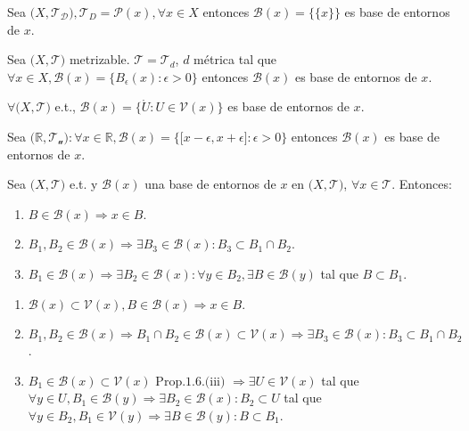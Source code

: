 \begin{ejm}
  Sea $\big( X, \mathcal{T_{D}} \big), \mathcal{T}_{D} = \mathcal{P}(x), \forall x \in X$ entonces $\mathcal{B}(x) =  \{ \{ x \} \}$ es base de entornos de $x$.
\end{ejm}

\begin{ejm}
  Sea $\big( X, \mathcal{T} \big)$ metrizable. $ \mathcal{T} = \mathcal{T}_{d}$, $d$ métrica tal que $\forall x \in X, \mathcal{B}(x) = \{ B_{\epsilon}(x) : \epsilon > 0 \}$ entonces $\mathcal{B}(x)$ es base de entornos de $x$.
\end{ejm}

\begin{ejm}
  $\forall \big( X, \mathcal{T} \big)$ e.t., $ \mathcal{B}(x) = \{  \mathring{U} : U \in \mathcal{V}(x) \}$ es base de entornos de $x$.
\end{ejm}

\begin{ejm}
  Sea $\big( \mathbb{R}, \mathcal{T_{u}} \big) : \forall x \in \mathbb{R}, \mathcal{B}(x) =  \{ \big[ x-\epsilon, x + \epsilon \big] : \epsilon > 0  \}$ entonces $\mathcal{B}(x)$ es base de entornos de $x$.
\end{ejm}

\begin{prop}
  Sea $\big( X, \mathcal{T} \big)$ e.t. y $\mathcal{B}(x)$ una base de entornos de $x$ en $\big( X, \mathcal{T} \big)$, $\forall x \in \mathcal{T}$. Entonces:
  \begin{enumerate}[label=(\roman*)]
    \item $B \in \mathcal{B}(x) \Rightarrow x \in B$.
    \item $B_{1},B_{2} \in \mathcal{B}(x) \Rightarrow \exists B_{3} \in \mathcal{B}(x): B_{3} \subset B_{1} \cap B_{2}$.
    \item $B_{1} \in \mathcal{B}(x) \Rightarrow \exists B_{2} \in \mathcal{B}(x): \forall y \in B_{2}, \exists B \in \mathcal{B}(y)$ tal que $ B \subset B_{1}$.
  \end{enumerate}
\end{prop}

\begin{dem}
  \begin{enumerate}[label=(\roman*)]
    \item $\mathcal{B}(x) \subset \mathcal{V}(x), B \in \mathcal{B}(x) \Rightarrow x \in B$.
    \item $B_{1}, B_{2} \in \mathcal{B}(x) \Rightarrow B_{1} \cap B_{2} \in \mathcal{B}(x) \subset \mathcal{V}(x) \Rightarrow \exists B_{3} \in \mathcal{B}(x): B_{3} \subset B_{1} \cap B_{2}$.
    \item $B_{1} \in \mathcal{B}(x) \subset \mathcal{V}(x) \text{ Prop.1.6.(iii) } \Rightarrow \exists U \in \mathcal{V}(x)$ tal que $\forall y \in U, B_{1} \in \mathcal{B}(y) \Rightarrow \exists B_{2} \in \mathcal{B}(x) : B_{2} \subset U$ tal que $\forall y \in B_{2}, B_{1} \in \mathcal{V}(y) \Rightarrow \exists B \in \mathcal{B}(y): B \subset B_{1}$.
  \end{enumerate}
\end{dem}

